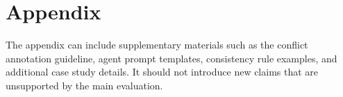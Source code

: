 \section{Appendix}
\label{appendix}
The appendix can include supplementary materials such as the conflict annotation
guideline, agent prompt templates, consistency rule examples, and additional case
study details. It should not introduce new claims that are unsupported by the main
evaluation.
